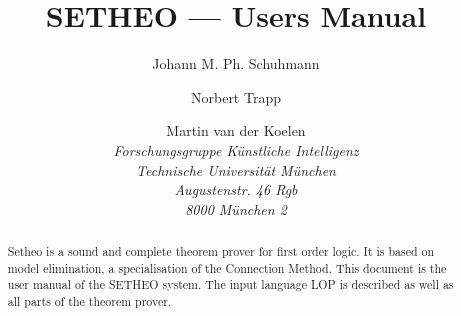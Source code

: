 
\setlength{\parindent}{0mm}

\newcommand{\ssection}[1]{\section{#1}}
\newcommand{\ssubsection}[1]{\subsection{#1}}
\newcommand{\ssubsubsection}[1]{\subsubsection{#1}}

\setlength{\unitlength}{1mm}
\setlength{\unitlength}{1mm}




\newcommand{\bild}[5]
{
	\begin{figure}[htbp]
		\centerline
		{
			\hbox
			{
				\psfig{figure=#1,height=#2,width=#3}
			}
		}
		\begin{center}
			\parbox{14cm}{\caption{\label{#5} #4}}
		\end{center}
	\end{figure}
}






\title{SETHEO --- Users Manual}
\author{Johann M. Ph. Schuhmann \and  Norbert Trapp \and Martin van der
Koelen\\
\it Forschungsgruppe K\"unstliche Intelligenz\\
Technische Universit\"{a}t M\"{u}nchen\\
Augustenstr. 46 Rgb\\
8000 M\"{u}nchen 2 \\
}
\maketitle

\vspace{15mm}
\begin{abstract}
Setheo is a sound and complete theorem prover for first order logic.
It is based on model elimination, a specialisation of the Connection
Method. This document is the user manual of the SETHEO system.
The input language LOP is described as well as all parts of the theorem
prover. 
\end{abstract}











